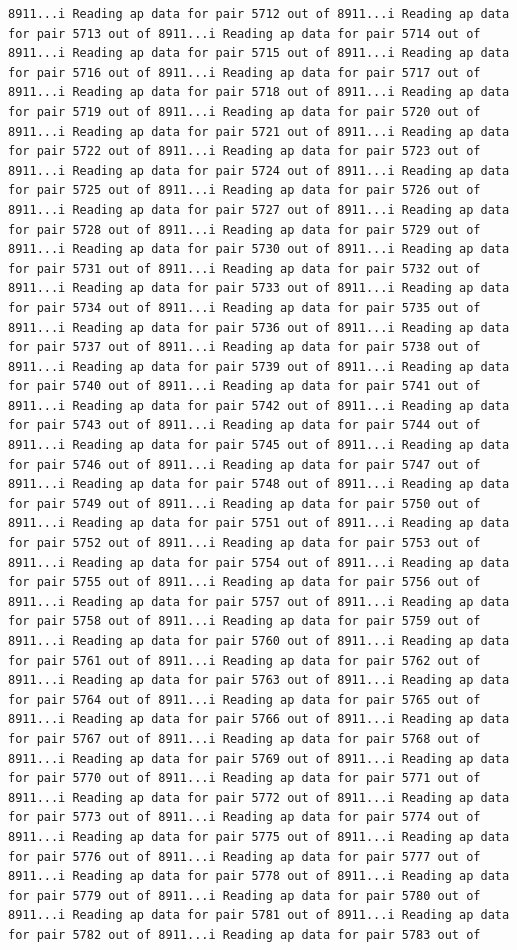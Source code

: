 \documentclass[
]{article}
\begin{document}
\begin{verbatim}
8911...i Reading ap data for pair 5712 out of 8911...i Reading ap data for pair 5713 out of 8911...i Reading ap data for pair 5714 out of 8911...i Reading ap data for pair 5715 out of 8911...i Reading ap data for pair 5716 out of 8911...i Reading ap data for pair 5717 out of 8911...i Reading ap data for pair 5718 out of 8911...i Reading ap data for pair 5719 out of 8911...i Reading ap data for pair 5720 out of 8911...i Reading ap data for pair 5721 out of 8911...i Reading ap data for pair 5722 out of 8911...i Reading ap data for pair 5723 out of 8911...i Reading ap data for pair 5724 out of 8911...i Reading ap data for pair 5725 out of 8911...i Reading ap data for pair 5726 out of 8911...i Reading ap data for pair 5727 out of 8911...i Reading ap data for pair 5728 out of 8911...i Reading ap data for pair 5729 out of 8911...i Reading ap data for pair 5730 out of 8911...i Reading ap data for pair 5731 out of 8911...i Reading ap data for pair 5732 out of 8911...i Reading ap data for pair 5733 out of 8911...i Reading ap data for pair 5734 out of 8911...i Reading ap data for pair 5735 out of 8911...i Reading ap data for pair 5736 out of 8911...i Reading ap data for pair 5737 out of 8911...i Reading ap data for pair 5738 out of 8911...i Reading ap data for pair 5739 out of 8911...i Reading ap data for pair 5740 out of 8911...i Reading ap data for pair 5741 out of 8911...i Reading ap data for pair 5742 out of 8911...i Reading ap data for pair 5743 out of 8911...i Reading ap data for pair 5744 out of 8911...i Reading ap data for pair 5745 out of 8911...i Reading ap data for pair 5746 out of 8911...i Reading ap data for pair 5747 out of 8911...i Reading ap data for pair 5748 out of 8911...i Reading ap data for pair 5749 out of 8911...i Reading ap data for pair 5750 out of 8911...i Reading ap data for pair 5751 out of 8911...i Reading ap data for pair 5752 out of 8911...i Reading ap data for pair 5753 out of 8911...i Reading ap data for pair 5754 out of 8911...i Reading ap data for pair 5755 out of 8911...i Reading ap data for pair 5756 out of 8911...i Reading ap data for pair 5757 out of 8911...i Reading ap data for pair 5758 out of 8911...i Reading ap data for pair 5759 out of 8911...i Reading ap data for pair 5760 out of 8911...i Reading ap data for pair 5761 out of 8911...i Reading ap data for pair 5762 out of 8911...i Reading ap data for pair 5763 out of 8911...i Reading ap data for pair 5764 out of 8911...i Reading ap data for pair 5765 out of 8911...i Reading ap data for pair 5766 out of 8911...i Reading ap data for pair 5767 out of 8911...i Reading ap data for pair 5768 out of 8911...i Reading ap data for pair 5769 out of 8911...i Reading ap data for pair 5770 out of 8911...i Reading ap data for pair 5771 out of 8911...i Reading ap data for pair 5772 out of 8911...i Reading ap data for pair 5773 out of 8911...i Reading ap data for pair 5774 out of 8911...i Reading ap data for pair 5775 out of 8911...i Reading ap data for pair 5776 out of 8911...i Reading ap data for pair 5777 out of 8911...i Reading ap data for pair 5778 out of 8911...i Reading ap data for pair 5779 out of 8911...i Reading ap data for pair 5780 out of 8911...i Reading ap data for pair 5781 out of 8911...i Reading ap data for pair 5782 out of 8911...i Reading ap data for pair 5783 out of 
\end{verbatim}
\end{document}
